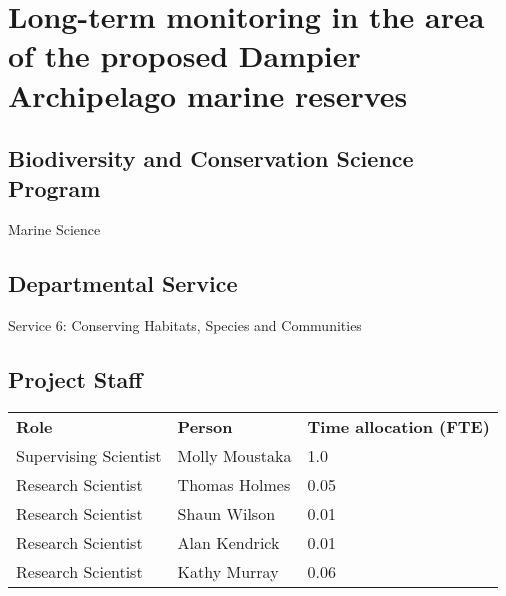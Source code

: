 \documentclass[version=last,
    paper=a4,                               %
    10pt,                                   %
    dvipsnames,
    oneside,                              %
    headings=openany,                       %
    open=any,
    BCOR=7mm,                               %
    DIV=15,     %
]{scrbook}
\begin{document}
\frontmatter
\maketitle
\mainmatter



\section*{Long-term monitoring in the area of the proposed Dampier Archipelago
marine reserves
}



\subsection*{Biodiversity and Conservation Science Program}

Marine Science




\subsection*{Departmental Service}

Service 6: Conserving Habitats, Species and Communities


\subsection*{Project Staff}
\begin{tabu} {X X X}
\textbf{Role} & \textbf{Person} & \textbf{Time allocation (FTE)}\\

Supervising Scientist & Molly Moustaka & 1.0\\

Research Scientist & Thomas Holmes & 0.05\\

Research Scientist & Shaun Wilson & 0.01\\

Research Scientist & Alan Kendrick & 0.01\\

Research Scientist & Kathy Murray & 0.06\\

\end{tabu}
\end{document}
